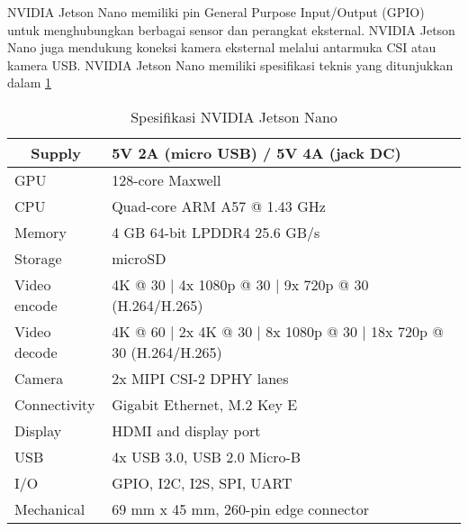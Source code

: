 NVIDIA Jetson Nano memiliki pin General Purpose Input/Output (GPIO) untuk menghubungkan berbagai sensor dan perangkat eksternal. NVIDIA Jetson Nano juga mendukung koneksi kamera eksternal melalui antarmuka CSI atau kamera USB. NVIDIA Jetson Nano memiliki spesifikasi teknis yang ditunjukkan dalam \cref{tab:jetson-nano}	

\begin{table}[H]
	\caption{Spesifikasi NVIDIA Jetson Nano}
	\label{tab:jetson-nano}
	\centering
	\begin{tabular}{|l|l|}
		\hline
		\multicolumn{1}{|c|}{Supply} & 5V 2A (micro USB) / 5V 4A (jack DC)                                \\ \hline
		GPU                          & 128-core Maxwell                                                   \\ \hline
		CPU                          & Quad-core ARM A57 @ 1.43 GHz                                       \\ \hline
		Memory                       & 4 GB 64-bit LPDDR4 25.6 GB/s                                       \\ \hline
		Storage                      & microSD                                                            \\ \hline
		Video encode                 & 4K @ 30 | 4x 1080p @ 30 | 9x 720p @ 30 (H.264/H.265)               \\ \hline
		Video decode                 & 4K @ 60 | 2x 4K @ 30 | 8x 1080p @ 30 | 18x 720p @ 30 (H.264/H.265) \\ \hline
		Camera                       & 2x MIPI CSI-2 DPHY lanes                                           \\ \hline
		Connectivity                 & Gigabit Ethernet, M.2 Key E                                        \\ \hline
		Display                      & HDMI and display port                                              \\ \hline
		USB                          & 4x USB 3.0, USB 2.0 Micro-B                                        \\ \hline
		I/O                          & GPIO, I2C, I2S, SPI, UART                                          \\ \hline
		Mechanical                   & 69 mm x 45 mm, 260-pin edge connector                              \\ \hline
	\end{tabular}
\end{table}

